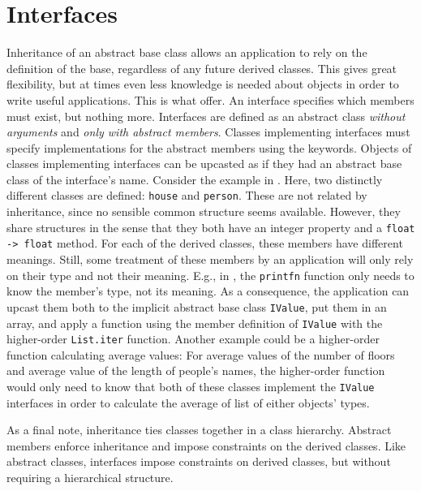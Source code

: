 \documentclass[fsharpNotes.tex]{subfiles}
\begin{document}
\section{Interfaces}
\label{sec:interfaces}
Inheritance of an abstract base class allows an application to rely on the definition of the base, regardless of any future derived classes. This gives great flexibility, but at times even less knowledge is needed about objects in order to write useful applications. This is what  offer. An interface specifies which members must exist, but nothing more. Interfaces are defined as an abstract class \emph{without arguments} and \emph{only with abstract members}. Classes implementing interfaces must specify implementations for the abstract members using the  keywords. Objects of classes implementing interfaces can be upcasted as if they had an abstract base class of the interface's name. Consider the example in .
%
%
Here, two distinctly different classes are defined: \lstinline{house} and \lstinline{person}. These are not related by inheritance, since no sensible common structure seems available. However, they share structures in the sense that they both have an integer property and a \lstinline{float -> float} method. For each of the derived classes, these members have different meanings. Still, some treatment of these members by an application will only rely on their type and not their meaning. E.g., in , the \lstinline{printfn} function only needs to know the member's type, not its meaning. As a consequence, the application can upcast them both to the implicit abstract base class \lstinline{IValue}, put them in an array, and apply a function using the member definition of \lstinline{IValue} with the higher-order \lstinline{List.iter} function. Another example could be a higher-order function calculating average values: For average values of the number of floors and average value of the length of people's names, the higher-order function would only need to know that both of these classes implement the \lstinline{IValue} interfaces in order to calculate the average of list of either objects' types.

As a final note, inheritance ties classes together in a class hierarchy. Abstract members enforce inheritance and impose constraints on the derived classes. Like abstract classes, interfaces impose constraints on derived classes, but without requiring a hierarchical structure.
\clearpage
\end{document}

